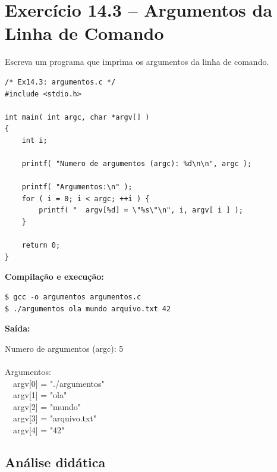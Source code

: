 \documentclass[12pt,a4paper]{article}
\begin{document}
\newpage

\section{Exercício 14.3 -- Argumentos da Linha de Comando}

\begin{enunciadoBox}[Enunciado 14.3]
Escreva um programa que imprima os argumentos da linha de comando.
\end{enunciadoBox}

\begin{respostabox}
\begin{lstlisting}
/* Ex14.3: argumentos.c */
#include <stdio.h>

int main( int argc, char *argv[] )
{
    int i;

    printf( "Numero de argumentos (argc): %d\n\n", argc );

    printf( "Argumentos:\n" );
    for ( i = 0; i < argc; ++i ) {
        printf( "  argv[%d] = \"%s\"\n", i, argv[ i ] );
    }

    return 0;
}
\end{lstlisting}

\textbf{Compilação e execução:}
\begin{lstlisting}
$ gcc -o argumentos argumentos.c
$ ./argumentos ola mundo arquivo.txt 42
\end{lstlisting}

\textbf{Saída:}
\begin{saida}
Numero de argumentos (argc): 5\\
\\
Argumentos:\\
\ \ argv[0] = "./argumentos"\\
\ \ argv[1] = "ola"\\
\ \ argv[2] = "mundo"\\
\ \ argv[3] = "arquivo.txt"\\
\ \ argv[4] = "42"
\end{saida}
\end{respostabox}

\subsection*{Análise didática}
\end{document}

